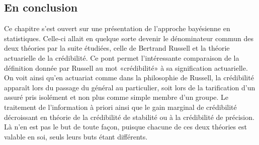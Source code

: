 \subsection{En conclusion}

Ce chapitre s'est ouvert sur une présentation de l'approche bayésienne
en statistiques. Celle-ci allait en quelque sorte devenir le
dénominateur commun des deux théories par la suite étudiées, celle de
Bertrand Russell et la théorie actuarielle de la crédibilité. Ce pont
permet l'intéressante comparaison de la définition donnée par Russell
au mot «crédibilité» à sa signification actuarielle. On voit ainsi
qu'en actuariat comme dans la philosophie de Russell, la crédibilité
apparaît lors du passage du général au particulier, soit lors de la
tarification d'un assuré pris isolément et non plus comme simple
membre d'un groupe. Le traitement de l'information à priori ainsi que
le gain marginal de crédibilité décroissant en théorie de la
crédibilité de stabilité ou à la crédibilité de précision. Là n'en est
pas le but de toute façon, puisque chacune de ces deux théories est
valable en soi, seuls leurs buts étant différents.

